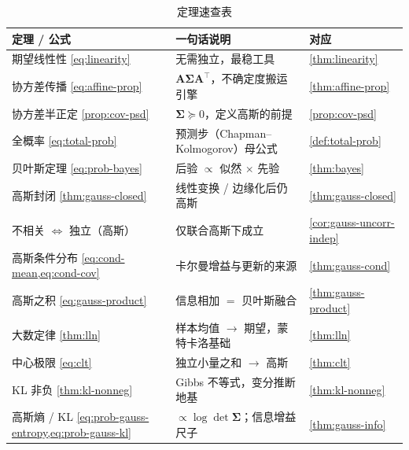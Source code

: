 \begin{table}[H]\centering\small
\caption{定理速查表}
\begin{tabular}{lll}
\toprule
定理 / 公式 & 一句话说明 & 对应 \\
\midrule
期望线性性 \cref{eq:linearity} & 无需独立，最稳工具 & \cref{thm:linearity} \\
协方差传播 \cref{eq:affine-prop} & $\mathbf{A}\boldsymbol{\Sigma}\mathbf{A}^\top$，不确定度搬运引擎 & \cref{thm:affine-prop} \\
协方差半正定 \cref{prop:cov-psd} & $\boldsymbol{\Sigma}\succeq0$，定义高斯的前提 & \cref{prop:cov-psd} \\
全概率 \cref{eq:total-prob} & 预测步（Chapman--Kolmogorov）母公式 & \cref{def:total-prob} \\
贝叶斯定理 \cref{eq:prob-bayes} & 后验 $\propto$ 似然 $\times$ 先验 & \cref{thm:bayes} \\
高斯封闭 \cref{thm:gauss-closed} & 线性变换 / 边缘化后仍高斯 & \cref{thm:gauss-closed} \\
不相关 $\Leftrightarrow$ 独立（高斯） & 仅联合高斯下成立 & \cref{cor:gauss-uncorr-indep} \\
高斯条件分布 \cref{eq:cond-mean,eq:cond-cov} & 卡尔曼增益与更新的来源 & \cref{thm:gauss-cond} \\
高斯之积 \cref{eq:gauss-product} & 信息相加 $=$ 贝叶斯融合 & \cref{thm:gauss-product} \\
大数定律 \cref{thm:lln} & 样本均值 $\to$ 期望，蒙特卡洛基础 & \cref{thm:lln} \\
中心极限 \cref{eq:clt} & 独立小量之和 $\to$ 高斯 & \cref{thm:clt} \\
KL 非负 \cref{thm:kl-nonneg} & Gibbs 不等式，变分推断地基 & \cref{thm:kl-nonneg} \\
高斯熵 / KL \cref{eq:prob-gauss-entropy,eq:prob-gauss-kl} & $\propto\log\det\boldsymbol{\Sigma}$；信息增益尺子 & \cref{thm:gauss-info} \\
\bottomrule
\end{tabular}
\end{table}


